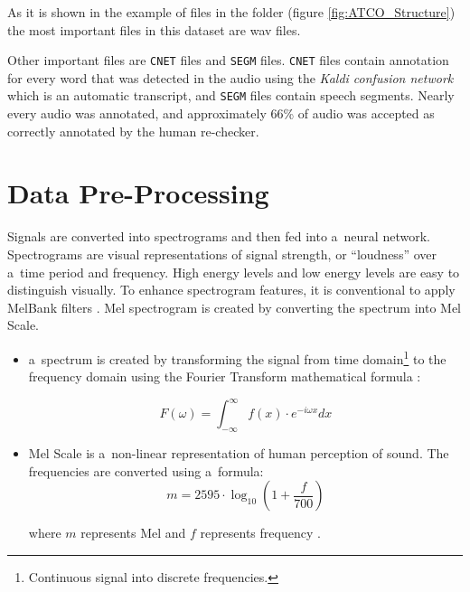     As it is shown in the example of files in the folder (figure \ref{fig:ATCO_Structure}) the most important files in this dataset are wav files.
    
    Other important files are \texttt{CNET} files and \texttt{SEGM} files. \texttt{CNET} files contain annotation for every word that was detected in the audio using the \textit{Kaldi confusion network} which is an automatic transcript, and \texttt{SEGM} files contain speech segments.  Nearly every audio was annotated, and approximately 66\% of audio was accepted as correctly annotated by the human re-checker. 

\section{Data Pre-Processing}\label{Dataset NN}

    Signals are converted into spectrograms and then fed into a~neural network. Spectrograms are visual representations of signal strength, or ``loudness'' over a~time period and frequency. High energy levels and low energy levels are easy to distinguish visually. To enhance spectrogram features, it is conventional to apply MelBank filters \cite{Leitner2019AudioRU}. Mel spectrogram is created by converting the spectrum into Mel Scale. 
    \begin{itemize}
    	\item a~spectrum is created by transforming the signal from time domain\footnote{Continuous signal into discrete frequencies.} to the frequency domain using the Fourier Transform mathematical formula \cite{heckbert1995fourier}:
     
            \begin{equation}\label{FT}
    	   F(\omega)=\int_{-\infty}^{\infty} f(x) \cdot e^{-i \omega x} d x
            \end{equation}
    	
    	\item Mel Scale is a~non-linear representation of human perception of sound. The frequencies are converted using a~formula:
            \begin{equation}\label{MS}
                m = 2595 \cdot \log _{10}\left(1+\frac{f}{700}\right)
             \end{equation}
    
        where $m$ represents Mel and $f$ represents frequency \cite{o1987speech}.
    \end{itemize}	

    \newpage

